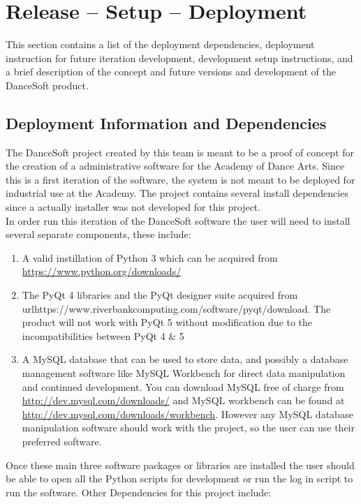 
\chapter{Release -- Setup -- Deployment}
This section contains a list of the deployment dependencies, deployment instruction for future iteration development, development setup instructions, and a brief description of the concept and future versions and development of the DanceSoft product.  


\section{Deployment Information and Dependencies}
The DanceSoft project created by this team is meant to be a proof of concept for the creation of a administrative software for the Academy of Dance Arts. Since this is a first iteration of the software, the system is not meant to be deployed for industrial use at the Academy. The project contains several install dependencies since a actually installer was not developed for this project.\\
In order run this iteration of the DanceSoft software the user will need to install several separate components, these include:

\begin{enumerate}
\item A valid instillation of Python 3 which can be acquired from \url{https://www.python.org/downloads/}
\item The PyQt 4 libraries and the PyQt designer suite acquired from url{https://www.riverbankcomputing.com/software/pyqt/download}. The product will not work with PyQt 5 without modification due to the incompatibilities between PyQt 4 \& 5
\item A MySQL database that can be used to store data, and possibly a database management software like MySQL Workbench for direct data manipulation and continued development. You can download MySQL free of charge from \url{http://dev.mysql.com/downloads/} and MySQL workbench can be found at \url{http://dev.mysql.com/downloads/workbench}. However any MySQL database manipulation software should work with the project, so the user can use their preferred software.
\end{enumerate}

Once these main three software packages or libraries are installed the user should be able to open all the Python scripts for development or run the log in script to run the software. Other Dependencies for this project include:

